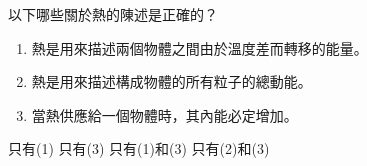 {
    以下哪些關於熱的陳述是正確的？
    \begin{enumerate}[label=\sd]
        \item 熱是用來描述兩個物體之間由於溫度差而轉移的能量。
        \item 熱是用來描述構成物體的所有粒子的總動能。
        \item 當熱供應給一個物體時，其內能必定增加。
    \end{enumerate}
    \begin{choices}
        \choice 只有(1)
        \choice 只有(3)
        \CorrectChoice 只有(1)和(3)
        \choice 只有(2)和(3)
    \end{choices}
}{}


